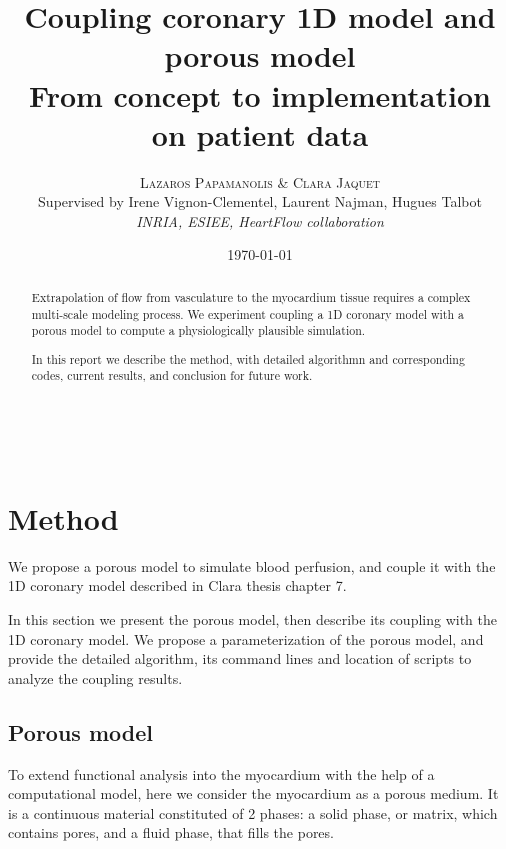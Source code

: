 \documentclass[a4paper, 11pt]{article} %
\title{\textbf{Coupling coronary 1D model and porous model}\\ %
From concept to implementation on patient data} %
\author{\textsc{Lazaros Papamanolis \& Clara Jaquet} \\ Supervised by Irene Vignon-Clementel, Laurent Najman, Hugues Talbot %
\\{\textit{INRIA, ESIEE, HeartFlow collaboration}}} %
\date{\today} %
\makeatletter
\renewcommand{\maketitle}{ %
\begin{flushright} %
{\LARGE\@title} %

\vspace{50pt} %

{\large\@author} %
\\\@date %

\vspace{40pt} %
\end{flushright}
}
\makeatother
\begin{document}
\maketitle %



\begin{abstract}
Extrapolation of flow from vasculature to the myocardium tissue requires a complex multi-scale modeling process. We experiment coupling a 1D coronary model with a porous model to compute a physiologically plausible simulation.  

In this report we describe the method, with detailed algorithmn and corresponding codes, current results, and conclusion for future work.
\end{abstract}



\vspace{30pt} %
\tableofcontents


\section{Method}

We propose a porous model to simulate blood perfusion, and couple it with the 1D coronary model described in Clara thesis chapter 7. 

In this section we present the porous model, then describe its coupling with the 1D coronary model. We propose a parameterization of the porous model, and provide the detailed algorithm, its command lines and location of scripts to analyze the coupling results.  
 
\subsection{Porous model}
To extend functional analysis into the myocardium with the help of a computational model, here we consider the myocardium as a porous medium. It is a continuous material constituted of 2 phases: a solid phase, or matrix, which contains pores, and a fluid phase, that fills the pores. 
\end{document}
